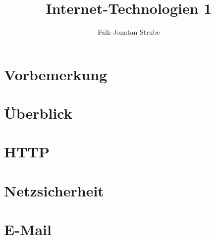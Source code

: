 \documentclass{scrreprt}
\title{Internet-Technologien 1}
\author{Falk-Jonatan Strube}
\begin{document}
\maketitle
\tableofcontents

\chapter*{Vorbemerkung}

\chapter{Überblick}


\chapter{HTTP}


\chapter{Netzsicherheit}




\chapter{E-Mail}


\end{document}
